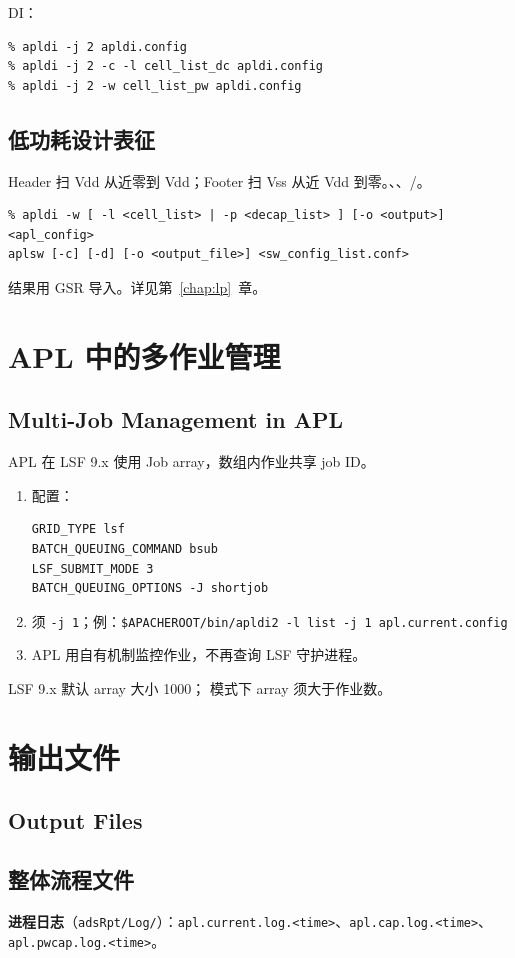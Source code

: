 DI：
\begin{lstlisting}
% apldi -j 2 apldi.config
% apldi -j 2 -c -l cell_list_dc apldi.config
% apldi -j 2 -w cell_list_pw apldi.config
\end{lstlisting}

\subsection{低功耗设计表征}
Header 扫 Vdd 从近零到 Vdd；Footer 扫 Vss 从近 Vdd 到零。、、/。
\begin{lstlisting}
% apldi -w [ -l <cell_list> | -p <decap_list> ] [-o <output>] <apl_config>
aplsw [-c] [-d] [-o <output_file>] <sw_config_list.conf>
\end{lstlisting}
结果用 GSR  导入。详见第~\ref{chap:lp}~章。

\section{APL 中的多作业管理}
\subsection*{Multi-Job Management in APL}

APL 在 LSF 9.x 使用 Job array，数组内作业共享 job ID。
\begin{enumerate}
  \item 配置：
\begin{lstlisting}
GRID_TYPE lsf
BATCH_QUEUING_COMMAND bsub
LSF_SUBMIT_MODE 3
BATCH_QUEUING_OPTIONS -J shortjob
\end{lstlisting}
  \item 须 \texttt{-j 1}；例：\texttt{\$APACHEROOT/bin/apldi2 -l list -j 1 apl.current.config}
  \item APL 用自有机制监控作业，不再查询 LSF 守护进程。
\end{enumerate}
LSF 9.x 默认 array 大小 1000； 模式下 array 须大于作业数。

\section{输出文件}
\subsection*{Output Files}

\subsection{整体流程文件}
\textbf{进程日志}（\texttt{adsRpt/Log/}）：\texttt{apl.current.log.<time>}、\texttt{apl.cap.log.<time>}、\texttt{apl.pwcap.log.<time>}。

